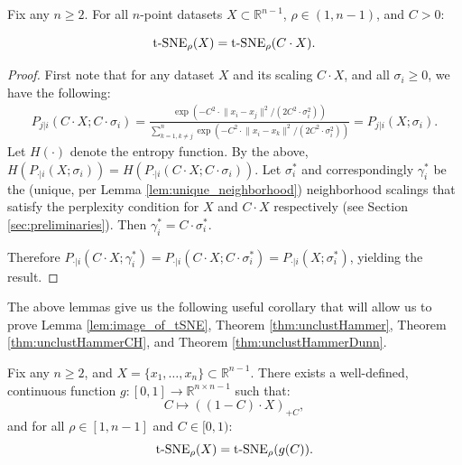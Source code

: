 \begin{lemma}\label{lem:tSNE_multiplicative_invariance}
    Fix any $n \geq 2$. For all $n$-point datasets $X \subset \mathbb{R}^{n-1}$, $\rho \in (1, n-1)$, and $C > 0$:

    $${\operatorname*{t-SNE}}_\rho({X}) = {\operatorname*{t-SNE}}_\rho(C \cdot X).$$
\end{lemma}

\begin{proof}
 First note that for any dataset $X$ and its scaling $C\cdot X$, and all $\sigma_i\geq 0$, we have the following:
    \begin{align*}
        P_{j|i}(C\cdot X; C\cdot \sigma_i) = \frac{\exp(-C^2\cdot\lVert x_i-x_j\rVert^2/(2C^2\cdot\sigma_i^2))}{\sum_{k=1, k\neq j}^n \exp(-C^2\cdot\lVert x_i-x_k\rVert^2/(2C^2\cdot\sigma_i^2))} = P_{j|i}(X; \sigma_i).
    \end{align*}
Let \(H(\cdot)\) denote the entropy function. By the above, \({H(P_{\cdot | i}(X;\sigma_i)) = H(P_{\cdot | i}(C\cdot X;C\cdot \sigma_i))}\). Let $\sigma^*_i$ and correspondingly $\gamma^*_i$ be the (unique, per Lemma \ref{lem:unique_neighborhood}) neighborhood scalings that satisfy the perplexity condition for \(X\) and \(C\cdot X\) respectively (see Section \ref{sec:preliminaries}). Then \(\gamma_i^* = C\cdot \sigma_i^*\).

Therefore \(P_{\cdot |i}(C\cdot X; \gamma_i^*) = P_{\cdot |i}(C\cdot X; C\cdot \sigma_i^*) =P_{\cdot |i}(X; \sigma_i^*) \), yielding the result. 
\end{proof}


The above lemmas give us the following useful corollary that will allow us to prove Lemma \ref{lem:image_of_tSNE}, Theorem \ref{thm:unclustHammer}, Theorem \ref{thm:unclustHammerCH}, and Theorem \ref{thm:unclustHammerDunn}.

\begin{corollary}\label{cor:g_exists}
    Fix any $n \geq 2$, and $X = \{x_1, \dots, x_n\} \subset \mathbb{R}^{n-1}.$ There exists a well-defined, continuous function $g: [0,1] \to \mathbb{R}^{n \times n-1}$ such that:
    $$C \mapsto ((1-C)\cdot X)_{+C},$$
    and for all $\rho \in [1, n-1]$ and $C \in [0,1):$
    $${\operatorname*{t-SNE}}_\rho(X) = {\operatorname*{t-SNE}}_\rho(g(C)).$$

\end{corollary}

